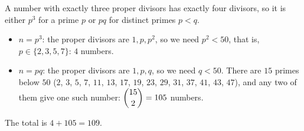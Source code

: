 A number with exactly three proper divisors has exactly four divisors, so it is either $p^3$ for a prime $p$ or $pq$ for distinct primes $p<q$.
\begin{itemize}
\item $n=p^3$: the proper divisors are $1,p,p^2$, so we need $p^2<50$, that is, $p\in\{2,3,5,7\}$: $4$ numbers.
\item $n=pq$: the proper divisors are $1,p,q$, so we need $q<50$. There are $15$ primes below $50$ ($2$, $3$, $5$, $7$, $11$, $13$, $17$, $19$, $23$, $29$, $31$, $37$, $41$, $43$, $47$), and any two of them give one such number: $\dbinom{15}{2}=105$ numbers.
\end{itemize}
The total is $4+105=\boxed{109}$.
